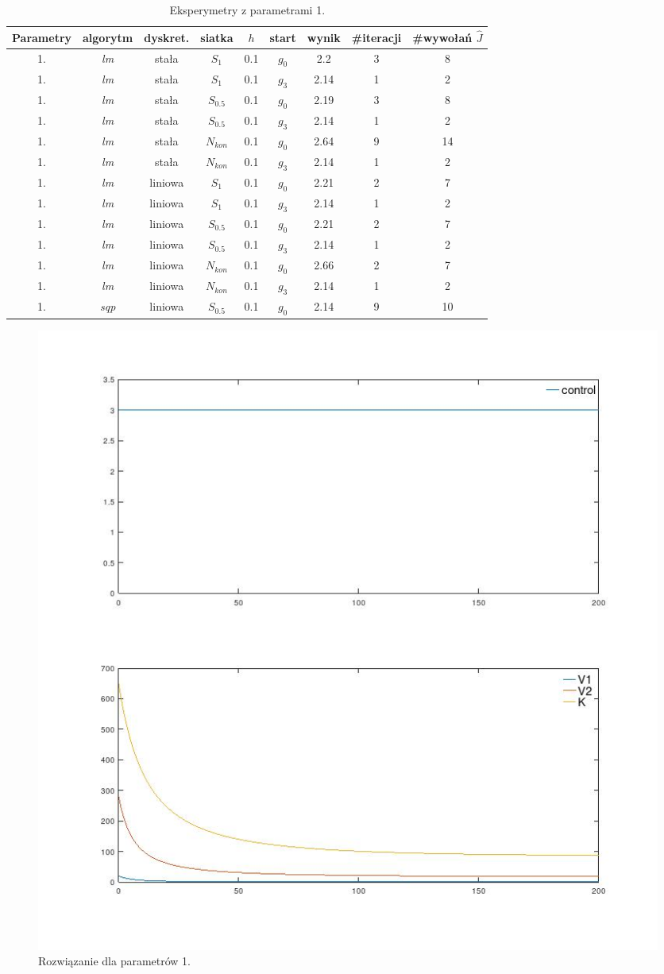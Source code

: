 \documentclass[11pt]{article}
\begin{document}
\begin{table}[h]
  \begin{center}
    \begin{tabular}{|c|c|c|c|c|c|c|c|c|}
      \hline
      Parametry & algorytm & dyskret. & siatka & $h$ & start & wynik & \#iteracji & \#wywołań $\hat{J}$ \\
      \hline
      1. & {\it lm\/} & stała & $S_1$ & 0.1 & $g_0$ & 2.2 & 3 & 8 \\
      \hline
      1. & {\it lm\/} & stała & $S_1$ & 0.1 & $g_3$ & 2.14 & 1 & 2 \\
      \hline
      1. & {\it lm\/} & stała & $S_{0.5}$ & 0.1 & $g_0$ & 2.19 & 3 & 8 \\
      \hline
      1. & {\it lm\/} & stała & $S_{0.5}$ & 0.1 & $g_3$ & 2.14 & 1 & 2 \\
      \hline
      1. & {\it lm\/} & stała & $N_{kon}$ & 0.1 & $g_0$ & 2.64 & 9 & 14 \\
      \hline
      1. & {\it lm\/} & stała & $N_{kon}$ & 0.1 & $g_3$ & 2.14 & 1 & 2 \\
      \hline
      1. & {\it lm\/} & liniowa & $S_1$ & 0.1 & $g_0$ & 2.21 & 2 & 7 \\
      \hline
      1. & {\it lm\/} & liniowa & $S_1$ & 0.1 & $g_3$ & 2.14 & 1 & 2 \\
      \hline
      1. & {\it lm\/} & liniowa & $S_{0.5}$ & 0.1 & $g_0$ & 2.21 & 2 & 7 \\
      \hline
      1. & {\it lm\/} & liniowa & $S_{0.5}$ & 0.1 & $g_3$ & 2.14 & 1 & 2 \\
      \hline
      1. & {\it lm\/} & liniowa & $N_{kon}$ & 0.1 & $g_0$ & 2.66 & 2 & 7 \\
      \hline
      1. & {\it lm\/} & liniowa & $N_{kon}$ & 0.1 & $g_3$ & 2.14 & 1 & 2 \\
      \hline
      1. & {\it sqp\/} & liniowa & $S_{0.5}$ & 0.1 & $g_0$ & 2.14 & 9 & 10 \\
      \hline
    \end{tabular}
    \caption{Eksperymetry z parametrami 1.}\label{param1_tbl}
  \end{center}
\end{table}

\begin{figure}[h]
  \centering
  \includegraphics[width=.5\textwidth]{../plots/plot_max}
  \caption{Rozwiązanie dla parametrów 1.}\label{max_plot}
\end{figure}
\end{document}
